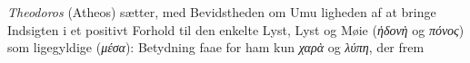 \documentclass[12pt,a4paper]{book}
\newcommand{\gk}[1]{\textit{#1}}
\begin{document}
\emph{Theodoros} (Atheos) sætter, med Bevidstheden om Umu\-%
ligheden af at bringe Indsigten i et positivt Forhold til den
enkelte Lyst, Lyst og Møie (\gk{ἡδονὴ} og \gk{πόνος}) som ligegyldige
(\gk{μέσα}): Betydning faae for ham kun \gk{χαρὰ} og \gk{λύπη}, der frem\-%
\end{document}
